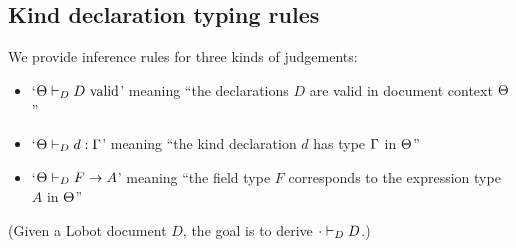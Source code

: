 \documentclass{article}
\begin{document}

\subsection{Kind declaration typing rules}



We provide inference rules for three kinds of judgements: 
\begin{itemize}
    \item `$\Theta \vdash_D D \text{ valid}$' meaning ``the declarations $D$ are valid in document context $\Theta$''
    \item `$\Theta \vdash_D d : \Gamma$' meaning ``the kind declaration $d$ has type $\Gamma$ in $\Theta$''
    \item `$\Theta \vdash_D F \to A$' meaning ``the field type $F$ corresponds to the expression type $A$ in $\Theta$''
\end{itemize}
(Given a Lobot document $D$, the goal is to derive $\cdot \vdash_D D$.) \\

\end{document}
